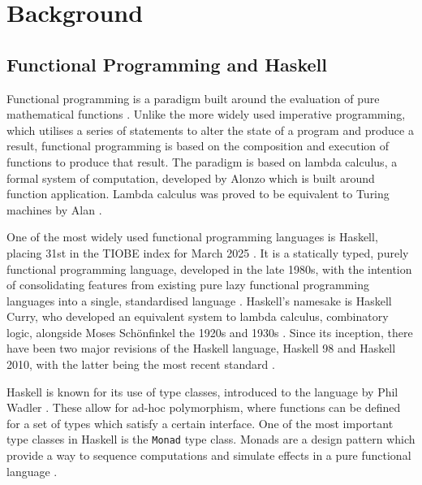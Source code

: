 \documentclass[../main.tex]{subfiles}
\begin{document}
\chapter{Background} \label{ch:background}
    \section{Functional Programming and Haskell}
        Functional programming is a paradigm built around the evaluation of pure
            mathematical functions \citep{fpPaulHudak}.
        Unlike the more widely used imperative programming, which utilises a series of
            statements to alter the state of a program and produce a result, functional
            programming is based on the composition and execution of functions to produce
            that result.
        The paradigm is based on lambda calculus, a formal system of computation,
            developed by Alonzo \citet{lambdaCalculus} which is built around function
            application.
        Lambda calculus was proved to be equivalent to Turing machines by Alan
            \citet{lambdaTuringComplete}.

        One of the most widely used functional programming languages is Haskell,
            placing 31st in the TIOBE index for March 2025 \citep{tiobeIndex}.
        It is a statically typed, purely functional programming language, developed in
            the late 1980s, with the intention of consolidating features from existing pure
            lazy functional programming languages into a single, standardised language
            \citep{haskellHistory}.
        Haskell's namesake is Haskell Curry, who developed an equivalent system to
            lambda calculus, combinatory logic, alongside Moses Schönfinkel the 1920s and
            1930s \citep{combinatoryLogic}.
        Since its inception, there have been two major revisions of the Haskell
            language, Haskell 98 and Haskell 2010, with the latter being the most recent
            standard \citep{haskell2010}.

        Haskell is known for its use of type classes, introduced to the language by
            Phil Wadler \citep{typeClasses}.
        These allow for ad-hoc polymorphism, where functions can be defined for a set
            of types which satisfy a certain interface.
        One of the most important type classes in Haskell is the \texttt{Monad} type
            class.
        Monads are a design pattern which provide a way to sequence computations and
            simulate effects in a pure functional language \citep{monads}.
\end{document}
